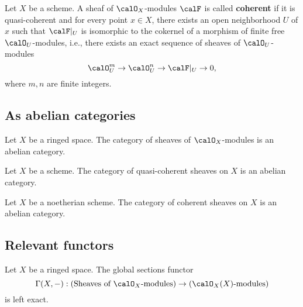     \begin{definition}\label{def:coherent_sheaf}
        Let $X$ be a scheme. A sheaf of $\calO_X$-modules $\calF$ is called \textbf{coherent} if it is quasi-coherent and for every point $x\in X$, there exists an open neighborhood $U$ of $x$ such that $\calF|_U$ is isomorphic to the cokernel of a morphism of finite free $\calO_U$-modules, i.e., there exists an exact sequence of sheaves of $\calO_U$-modules
        \[
            \calO_U^m \to \calO_U^n \to \calF|_U \to 0,
        \]
        where $m,n$ are finite integers.
    \end{definition}

\subsection{As abelian categories}

    \begin{theorem}\label{thm:category_of_sheaves_of_modules_is_abelian}
        Let $X$ be a ringed space. The category of sheaves of $\calO_X$-modules is an abelian category.
    \end{theorem}

    \begin{theorem}\label{thm:category_of_quasi-coherent_sheaves_is_abelian}
        Let $X$ be a scheme. The category of quasi-coherent sheaves on $X$ is an abelian category.
    \end{theorem}

    \begin{theorem}\label{thm:category_of_coherent_sheaves_is_abelian}
        Let $X$ be a noetherian scheme. The category of coherent sheaves on $X$ is an abelian category.
    \end{theorem}

\subsection{Relevant functors}

    \begin{theorem}\label{thm:global_sections_functor}
        Let $X$ be a ringed space. The global sections functor
        \[
            \Gamma(X,-): \text{(Sheaves of $\calO_X$-modules)} \to \text{($\calO_X(X)$-modules)}
        \]
        is left exact.
    \end{theorem}

